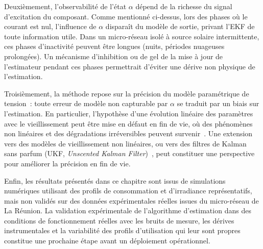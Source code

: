 Deuxièmement, l'observabilité de l'état $\alpha$ dépend de la richesse du signal d'excitation du composant. Comme mentionné ci-dessus, lors des phases où le courant est nul, l'influence de $\alpha$ disparaît du modèle de sortie, privant l'EKF de toute information utile. Dans un micro-réseau isolé à source solaire intermittente, ces phases d'inactivité peuvent être longues (nuits, périodes nuageuses prolongées). Un mécanisme d'inhibition ou de gel de la mise à jour de l'estimateur pendant ces phases permettrait d'éviter une dérive non physique de l'estimation.

Troisièmement, la méthode repose sur la précision du modèle paramétrique de tension~: toute erreur de modèle non capturable par $\alpha$ se traduit par un biais sur l'estimation. En particulier, l'hypothèse d'une évolution linéaire des paramètres avec le vieillissement peut être mise en défaut en fin de vie, où des phénomènes non linéaires et des dégradations irréversibles peuvent survenir~\cite{nguyen_comprehensive_2023}. Une extension vers des modèles de vieillissement non linéaires, ou vers des filtres de Kalman sans parfum (UKF, \textit{Unscented Kalman Filter})~\cite{chen_fuel_2019}, peut constituer une perspective pour améliorer la précision en fin de vie.

Enfin, les résultats présentés dans ce chapitre sont issus de simulations numériques utilisant des profils de consommation et d'irradiance représentatifs, mais non validés sur des données expérimentales réelles issues du micro-réseau de La Réunion. La validation expérimentale de l'algorithme d'estimation dans des conditions de fonctionnement réelles avec les bruits de mesure, les dérives instrumentales et la variabilité des profils d'utilisation qui leur sont propres constitue une prochaine étape avant un déploiement opérationnel.

\newpage